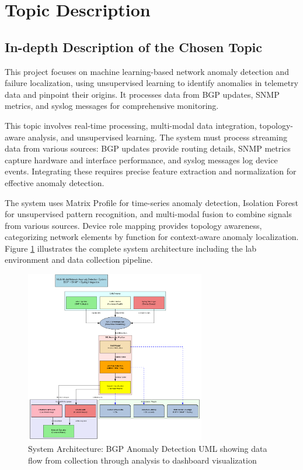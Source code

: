 \documentclass[11pt]{article}
\begin{document}
\section{Topic Description}

\subsection{In-depth Description of the Chosen Topic}

This project focuses on machine learning-based network anomaly detection and failure localization, using unsupervised learning to identify anomalies in telemetry data and pinpoint their origins. It processes data from BGP updates, SNMP metrics, and syslog messages for comprehensive monitoring.

This topic involves real-time processing, multi-modal data integration, topology-aware analysis, and unsupervised learning. The system must process streaming data from various sources: BGP updates provide routing details, SNMP metrics capture hardware and interface performance, and syslog messages log device events. Integrating these requires precise feature extraction and normalization for effective anomaly detection.

The system uses Matrix Profile for time-series anomaly detection, Isolation Forest for unsupervised pattern recognition, and multi-modal fusion to combine signals from various sources. Device role mapping provides topology awareness, categorizing network elements by function for context-aware anomaly localization. Figure \ref{fig:architecture} illustrates the complete system architecture including the lab environment and data collection pipeline.

\begin{figure}[h]
\centering
\includegraphics[width=0.7\textwidth]{system_architecture.png}
\caption{System Architecture: BGP Anomaly Detection UML showing data flow from collection through analysis to dashboard visualization}
\label{fig:architecture}
\end{figure}
\end{document}
